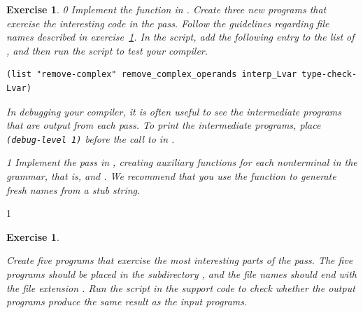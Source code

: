 \documentclass[7x10]{TimesAPriori_MIT}%
\def\racketEd{0}
\def\pythonEd{1}
\providecommand{\BookEdition}{1}
\let\edition\BookEdition
\newcommand{\pythonColor}[0]{}
\newtheorem{exercise}[theorem]{Exercise}
\numberwithin{theorem}{chapter}
\numberwithin{definition}{chapter}
\numberwithin{equation}{chapter}
\begin{document}
\begin{exercise}
  \normalfont\normalsize
{\if\edition\racketEd  
Implement the  function in
.
%
Create three new \LangVar{} programs that exercise the interesting
code in the  pass.  Follow the guidelines
regarding file names described in exercise~\ref{ex:Lvar}.
%
In the  script, add the following entry to the
list of , and then run the script to test your compiler.
\begin{lstlisting}
(list "remove-complex" remove_complex_operands interp_Lvar type-check-Lvar)
\end{lstlisting}
In debugging your compiler, it is often useful to see the intermediate
programs that are output from each pass. To print the intermediate
programs, place \lstinline{(debug-level 1)} before the call to
 in .  \fi}
%
{\if\edition\pythonEd\pythonColor
  Implement the  pass in
  , creating auxiliary functions for each
  nonterminal in the grammar, that is, 
  and . We recommend that you use the function
   to generate fresh names from a stub string.
\fi}  
\end{exercise}

{\if\edition\pythonEd\pythonColor
\begin{exercise}
\normalfont\normalsize
\label{ex:Lvar}

Create five \LangVar{} programs that exercise the most interesting
parts of the  pass.  The five programs
should be placed in the subdirectory , and the file
names should end with the file extension .  Run the
 script in the support code to check whether the
output programs produce the same result as the input programs.
\end{exercise}

\fi}
\end{document}
